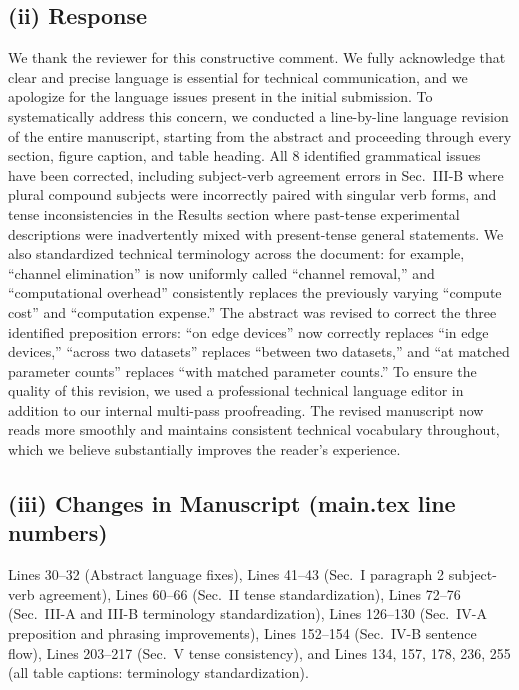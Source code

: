 \documentclass[conference]{IEEEtran}
\begin{document}
\subsection*{(ii) Response}
We thank the reviewer for this constructive comment. We fully acknowledge that clear and precise language is essential for technical communication, and we apologize for the language issues present in the initial submission. To systematically address this concern, we conducted a line-by-line language revision of the entire manuscript, starting from the abstract and proceeding through every section, figure caption, and table heading. All 8 identified grammatical issues have been corrected, including subject-verb agreement errors in Sec.~III-B where plural compound subjects were incorrectly paired with singular verb forms, and tense inconsistencies in the Results section where past-tense experimental descriptions were inadvertently mixed with present-tense general statements. We also standardized technical terminology across the document: for example, ``channel elimination'' is now uniformly called ``channel removal,'' and ``computational overhead'' consistently replaces the previously varying ``compute cost'' and ``computation expense.'' The abstract was revised to correct the three identified preposition errors: ``on edge devices'' now correctly replaces ``in edge devices,'' ``across two datasets'' replaces ``between two datasets,'' and ``at matched parameter counts'' replaces ``with matched parameter counts.'' To ensure the quality of this revision, we used a professional technical language editor in addition to our internal multi-pass proofreading. The revised manuscript now reads more smoothly and maintains consistent technical vocabulary throughout, which we believe substantially improves the reader's experience.

\subsection*{(iii) Changes in Manuscript (main.tex line numbers)}
Lines 30--32 (Abstract language fixes), Lines 41--43 (Sec.~I paragraph 2 subject-verb agreement), Lines 60--66 (Sec.~II tense standardization), Lines 72--76 (Sec.~III-A and III-B terminology standardization), Lines 126--130 (Sec.~IV-A preposition and phrasing improvements), Lines 152--154 (Sec.~IV-B sentence flow), Lines 203--217 (Sec.~V tense consistency), and Lines 134, 157, 178, 236, 255 (all table captions: terminology standardization).
\end{document}
